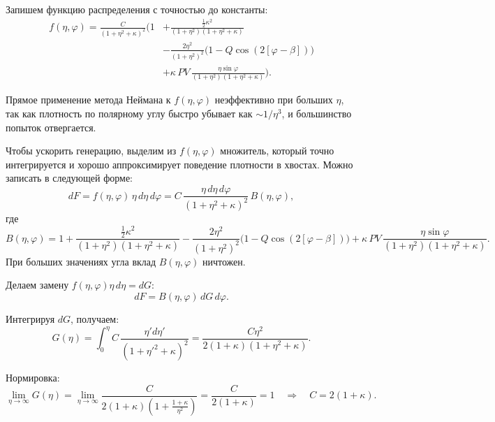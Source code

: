 \documentclass[12pt,a4paper]{article}
\begin{document}
Запишем функцию распределения с точностью до константы:
\begin{equation}
\label{eq:density_function}
\begin{aligned}
f(\eta, \varphi) = \frac{C}{\left(1 + \eta^2 + \kappa\right)^2} \Biggl(1 
&+ \frac{\frac{1}{2} \kappa^2}{(1+\eta^2)(1+\eta^2+\kappa)} \\
&- \frac{2\eta^2}{(1+\eta^2)^2}\bigl(1-Q\cos (2[\varphi-\beta])\bigr) \\
&+ \kappa\, PV\, \frac{\eta \sin \varphi}{(1+\eta^2)(1+\eta^2+\kappa)} \Biggr).
\end{aligned}
\end{equation}


Прямое применение метода Неймана к $f(\eta,\varphi)$ неэффективно при больших $\eta$, 
так как плотность по полярному углу быстро убывает как $\sim 1/\eta^3$, и большинство попыток отвергается.

Чтобы ускорить генерацию, выделим из $f(\eta,\varphi)$ множитель, который точно 
интегрируется и хорошо аппроксимирует поведение плотности в хвостах. 
Можно записать в следующей форме:
\begin{equation}
dF = f(\eta, \varphi)\,\eta\, d\eta\, d\varphi = C\,\frac{\eta\, d\eta\, d\varphi}{(1+\eta^2+\kappa)^2}\, B(\eta, \varphi),
\end{equation}
где
\begin{equation}
B(\eta,\varphi) = 1 + \frac{\frac{1}{2}\kappa^2}{(1+\eta^2)(1+\eta^2+\kappa)} 
- \frac{2\eta^2}{(1+\eta^2)^2}\bigl(1-Q\cos(2[\varphi-\beta])\bigr) 
+ \kappa\, PV\, \frac{\eta\sin\varphi}{(1+\eta^2)(1+\eta^2+\kappa)}.
\end{equation}
При больших значениях угла вклад $B(\eta, \varphi)$ ничтожен.

Делаем замену $f(\eta, \varphi)\eta\, d\eta = dG$:
\begin{equation}
dF = B(\eta, \varphi)\, dG\, d\varphi.
\end{equation}

Интегрируя $dG$, получаем:
\begin{equation}
G(\eta) = \int_0^\eta C\,\frac{\eta' d\eta'}{(1+\eta'^2+\kappa)^2} 
= \frac{C\eta^2}{2(1+\kappa)(1+\eta^2+\kappa)}.
\end{equation}

Нормировка:
\begin{equation}
\lim_{\eta \to \infty} G(\eta) = \lim_{\eta \to \infty} 
\frac{C}{2(1+\kappa)\left(1 + \frac{1+\kappa}{\eta^2}\right)} 
= \frac{C}{2(1+\kappa)} = 1 \quad\Rightarrow\quad C = 2(1+\kappa).
\end{equation}
\end{document}

